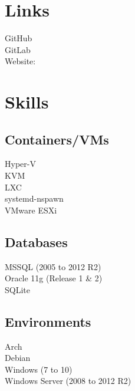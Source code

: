 \documentclass[]{formatting}
\begin{document}
%
%


%
%

\begin{minipage}[t]{0.33\textwidth}


\section{Links}
GitHub \href{https://github.com/enckse}{} \\
GitLab \href{https://gitlab.com/enckse}{} \\
Website:  \href{https://enck.network}{} \\
\sectionsep


\section{Skills}

\subsection{Containers/VMs}
\textbullet{} Hyper-V \\
\textbullet{} KVM \\
\textbullet{} LXC \\
\textbullet{} systemd-nspawn \\
\textbullet{} VMware ESXi
\sectionsep

\subsection{Databases}
\textbullet{} MSSQL (2005 to 2012 R2) \\
\textbullet{} Oracle 11g (Release 1 \& 2) \\
\textbullet{} SQLite
\sectionsep

\subsection{Environments}
\textbullet{} Arch \\ 
\textbullet{} Debian \\
\textbullet{} Windows (7 to 10) \\
\textbullet{} Windows Server (2008 to 2012 R2)
\sectionsep


\end{minipage}
\end{document}
